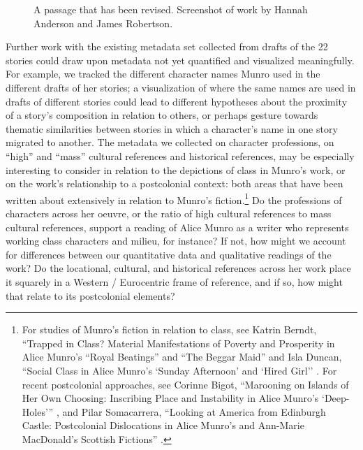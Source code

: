 \begin{paper}
\begin{figure}[t]
\vspace{2em}

    \centering
    \caption{A passage that has been revised. Screenshot of work by Hannah Anderson and James Robertson.}
    \label{fig:wiens7}
\end{figure}



Further work with the existing metadata set collected from drafts of the
22 stories could draw upon metadata not yet quantified and visualized
meaningfully. For example, we tracked the different character names
Munro used in the different drafts of her stories; a visualization of
where the same names are used in drafts of different stories could lead
to different hypotheses about the proximity of a story's composition in
relation to others, or perhaps gesture towards thematic similarities
between stories in which a character's name in one story migrated to
another. The metadata we collected on character professions, on ``high''
and ``mass'' cultural references and historical references, may be
especially interesting to consider in relation to the depictions of
class in Munro's work, or on the work's relationship to a postcolonial
context: both areas that have been written about extensively in relation
to Munro's fiction.\footnote{For studies of Munro's fiction in relation
  to class, see Katrin Berndt, ``Trapped in Class? Material
  Manifestations of Poverty and Prosperity in Alice Munro's ``Royal
  Beatings'' and ``The Beggar Maid'' \citep{berndt_trapped_2020} and Isla Duncan, ``Social Class in Alice Munro's `Sunday
  Afternoon' and `Hired Girl'' \citep{duncan_social_2009}. For recent postcolonial
  approaches, see Corinne Bigot, ``Marooning on Islands of Her Own
  Choosing: Inscribing Place and Instability in Alice Munro's
  `Deep-Holes''' \citep{bigot_marooning_2020}, and Pilar Somacarrera, ``Looking at America from
  Edinburgh Castle: Postcolonial Dislocations in Alice Munro's and
  Ann-Marie MacDonald's Scottish Fictions'' \citep{somacarrera_looking_2016}.} Do the professions of
characters across her oeuvre, or the ratio of high cultural references
to mass cultural references, support a reading of Alice Munro as a
writer who represents working class characters and milieu, for instance?
If not, how might we account for differences between our quantitative
data and qualitative readings of the work? Do the locational, cultural,
and historical references across her work place it squarely in a Western
/ Eurocentric frame of reference, and if so, how might that relate to
its postcolonial elements?


\end{paper}
